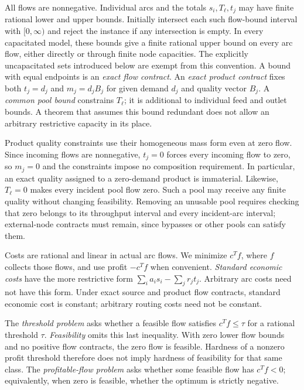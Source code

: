 All flows are nonnegative. Individual arcs and the totals $s_i,T_\ell,t_j$
may have finite rational lower and upper bounds. Initially intersect
each such flow-bound interval with $[0,\infty)$ and reject the instance
if any intersection is empty. In every capacitated
model, these bounds give a finite rational upper bound on every arc flow,
either directly or through finite node capacities. The explicitly
uncapacitated sets introduced below are exempt from this convention.
A bound with equal
endpoints is an \emph{exact flow contract}. An \emph{exact product
contract} fixes both $t_j=d_j$ and $m_j=d_jB_j$ for given demand $d_j$
and quality vector $B_j$. A \emph{common pool bound} constrains $T_\ell$;
it is additional to individual feed and outlet bounds. A theorem that
assumes this bound redundant does not allow an arbitrary restrictive
capacity in its place.

Product quality constraints use their homogeneous mass form even at
zero flow. Since incoming flows are nonnegative, $t_j=0$ forces every
incoming flow to zero, so $m_j=0$ and the constraints impose no composition
requirement. In particular, an exact quality assigned to a zero-demand
product is immaterial. Likewise, $T_\ell=0$ makes every incident pool
flow zero. Such a pool may receive any finite quality without changing
feasibility. Removing an unusable pool requires checking that zero belongs
to its throughput interval and every incident-arc interval; external-node
contracts must remain, since bypasses or other pools can satisfy them.

Costs are rational and linear in actual arc flows. We minimize $c^Tf$,
where $f$ collects those flows, and use profit $-c^Tf$ when convenient.
\emph{Standard economic costs} have the more restrictive form
$\sum_i a_i s_i-\sum_j r_jt_j$. Arbitrary arc costs need not have this
form. Under exact source and product flow contracts, standard economic
cost is constant; arbitrary routing costs need not be constant.

The \emph{threshold problem} asks whether a feasible flow satisfies
$c^Tf\le\tau$ for a rational threshold $\tau$. \emph{Feasibility} omits
this last inequality. With zero lower flow bounds and no positive flow
contracts, the zero flow is feasible. Hardness of a nonzero profit
threshold therefore does not imply hardness of feasibility for that
same class. The \emph{profitable-flow problem} asks whether some feasible
flow has $c^Tf<0$; equivalently, when zero is feasible, whether the optimum
is strictly negative.

